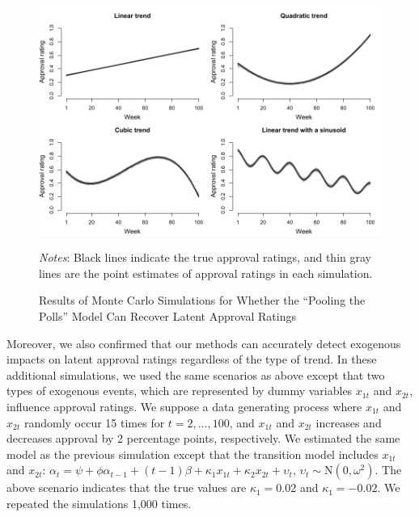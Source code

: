\documentclass[12pt,letterpaper]{scrartcl}
\begin{document}
\begin{figure}[t]
\begin{minipage}{\hsize}
\centering
\singlespacing
\includegraphics[scale=1]{Figure_JCR/AR1_simulation_1.pdf}
\caption{Results of Monte Carlo Simulations for Whether the ``Pooling the Polls'' Model Can Recover Latent Approval Ratings}
\label{figure_simulation_1}
\end{minipage}
\begin{minipage}{\hsize}
\bigskip
\small
\emph{Notes}: Black lines indicate the true approval ratings, and thin gray lines are the point estimates of approval ratings in each simulation.
\bigskip
\end{minipage}
\end{figure}

Moreover, we also confirmed that our methods can accurately detect exogenous impacts on latent approval ratings regardless of the type of trend. In these additional simulations, we used the same scenarios as above except that two types of exogenous events, which are represented by dummy variables $x_{1t}$ and $x_{2t}$, influence approval ratings. We suppose a data generating process where $x_{1t}$ and $x_{2t}$ randomly occur 15 times for $t=2,\ldots ,100$, and $x_{1t}$ and $x_{2t}$ increases and decreases approval by 2 percentage points, respectively. We estimated the same model as the previous simulation except that the transition model includes $x_{1t}$ and $x_{2t}$: $\alpha _{t}=\psi + \phi \alpha _{t-1}+(t-1)\beta +\kappa _{1}x_{1t}+\kappa _{2}x_{2t}+\upsilon _{t}$, $\upsilon _{t}\sim \mathrm{N}(0,\omega ^{2})$. The above scenario indicates that the true values are $\kappa _{1}=0.02$ and $\kappa _{1}=-0.02$. We repeated the simulations 1,000 times.
\end{document}
